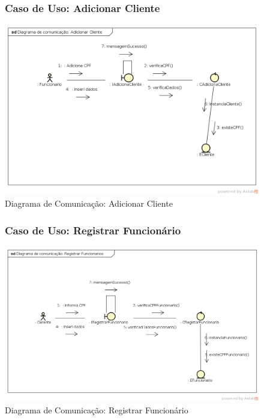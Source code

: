 \documentclass[
	12pt,				%
	openright,
	oneside,			%
	a4paper,			%
	chapter=TITLE,		%
	brazil				%
	]{abntex2}
\begin{document}
\begin{figure}[h!]

\subsubsection*{Caso de Uso: Adicionar Cliente}


	\caption{Diagrama de Comunicação: Adicionar Cliente}
	\begin{center}
	    \includegraphics[scale=0.5]{Arquivos/Projeto/C_adicionar_cliente}  
	\end{center}
\end{figure}




\begin{figure}[h!]

\subsubsection*{Caso de Uso: Registrar Funcionário}


	\caption{Diagrama de Comunicação: Registrar Funcionário}
	\begin{center}
	    \includegraphics[scale=0.5]{Arquivos/Projeto/C_registrar_funcionario}  
	\end{center}
\end{figure}
\end{document}
